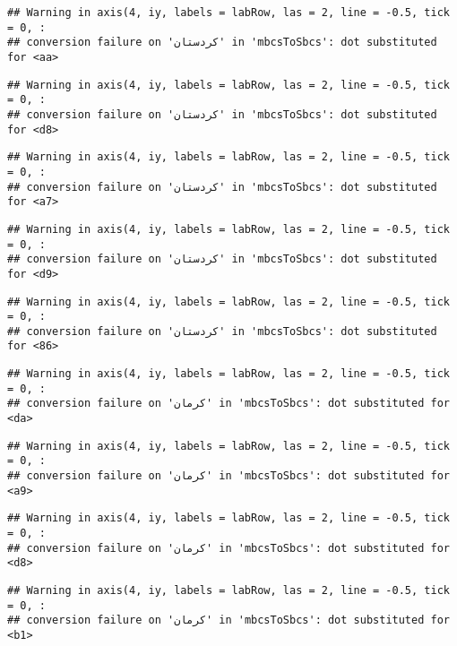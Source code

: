 \documentclass[
]{article}
\begin{document}
\begin{verbatim}
## Warning in axis(4, iy, labels = labRow, las = 2, line = -0.5, tick = 0, :
## conversion failure on 'کردستان' in 'mbcsToSbcs': dot substituted for <aa>
\end{verbatim}

\begin{verbatim}
## Warning in axis(4, iy, labels = labRow, las = 2, line = -0.5, tick = 0, :
## conversion failure on 'کردستان' in 'mbcsToSbcs': dot substituted for <d8>
\end{verbatim}

\begin{verbatim}
## Warning in axis(4, iy, labels = labRow, las = 2, line = -0.5, tick = 0, :
## conversion failure on 'کردستان' in 'mbcsToSbcs': dot substituted for <a7>
\end{verbatim}

\begin{verbatim}
## Warning in axis(4, iy, labels = labRow, las = 2, line = -0.5, tick = 0, :
## conversion failure on 'کردستان' in 'mbcsToSbcs': dot substituted for <d9>
\end{verbatim}

\begin{verbatim}
## Warning in axis(4, iy, labels = labRow, las = 2, line = -0.5, tick = 0, :
## conversion failure on 'کردستان' in 'mbcsToSbcs': dot substituted for <86>
\end{verbatim}

\begin{verbatim}
## Warning in axis(4, iy, labels = labRow, las = 2, line = -0.5, tick = 0, :
## conversion failure on 'کرمان' in 'mbcsToSbcs': dot substituted for <da>
\end{verbatim}

\begin{verbatim}
## Warning in axis(4, iy, labels = labRow, las = 2, line = -0.5, tick = 0, :
## conversion failure on 'کرمان' in 'mbcsToSbcs': dot substituted for <a9>
\end{verbatim}

\begin{verbatim}
## Warning in axis(4, iy, labels = labRow, las = 2, line = -0.5, tick = 0, :
## conversion failure on 'کرمان' in 'mbcsToSbcs': dot substituted for <d8>
\end{verbatim}

\begin{verbatim}
## Warning in axis(4, iy, labels = labRow, las = 2, line = -0.5, tick = 0, :
## conversion failure on 'کرمان' in 'mbcsToSbcs': dot substituted for <b1>
\end{verbatim}
\end{document}
